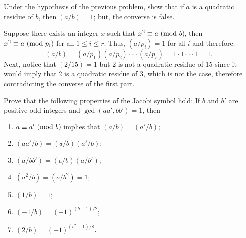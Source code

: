 \begin{exercise}
    Under the hypothesis of the previous problem, show that if $a$ is a quadratic residue of $b$, then $(a/b) = 1$; but, the converse is false. \\
\end{exercise}

\begin{solution}
    Suppose there exists an integer $x$ such that $x^2 \equiv a \ (\mathrm{mod}\ b)$, then $x^2 \equiv a \ (\mathrm{mod}\ p_i)$ for all $1 \leq i \leq r$. Thus, $(a/p_i) = 1$ for all $i$ and therefore:
    $$(a/b) = (a/p_1)(a/p_2) \cdot \cdot \cdot (a/p_r) = 1\cdot 1 \cdot \cdot \cdot 1 = 1.$$
    Next, notice that $(2/15) = 1$ but 2 is not a quadratic residue of 15 since it would imply that 2 is a quadratic residue of 3, which is not the case, therefore contradicting the converse of the first part. \\
\end{solution}

\begin{exercise}
    Prove that the following properties of the Jacobi symbol hold: If $b$ and $b'$ are positive odd integers and $\gcd(aa',bb') = 1$, then
    \begin{enumerate}
        \item $a\equiv a' \ (\mathrm{mod}\ b)$ implies that $(a/b) = (a'/b)$;
        \item $(aa'/b) = (a/b)(a'/b)$;
        \item $(a/bb') = (a/b)(a/b')$;
        \item $(a^2/b) = (a/b^2) = 1$;
        \item $(1/b) = 1$;
        \item $(-1/b) = (-1)^{(b-1)/2}$; 
        \item $(2/b) = (-1)^{(b^2-1)/8}$.  \\
    \end{enumerate}
\end{exercise}

